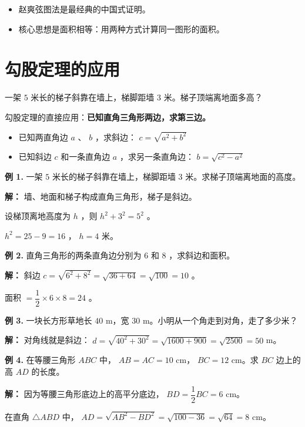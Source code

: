 \begin{keytakeaway}


\begin{itemize}
  \item 赵爽弦图法是最经典的中国式证明。
  \item 核心思想是面积相等：用两种方式计算同一图形的面积。
\end{itemize}


\end{keytakeaway}



\section*{勾股定理的应用}


\begin{explore}


一架 $5$ 米长的梯子斜靠在墙上，梯脚距墙 $3$ 米。梯子顶端离地面多高？

\end{explore}

\begin{understand}


勾股定理的直接应用：\textbf{已知直角三角形两边，求第三边。}

\begin{itemize}
  \item 已知两直角边 $a$ 、 $b$ ，求斜边： $c = \sqrt{a^2 + b^2}$
  \item 已知斜边 $c$ 和一条直角边 $a$ ，求另一条直角边： $b = \sqrt{c^2 - a^2}$
\end{itemize}


\end{understand}

\begin{workedexamples}


\textbf{例 1.} 一架 $5$ 米长的梯子斜靠在墙上，梯脚距墙 $3$ 米。求梯子顶端离地面的高度。

\textbf{解：}
墙、地面和梯子构成直角三角形，梯子是斜边。

设梯顶离地高度为 $h$ ，则 $h^2 + 3^2 = 5^2$ 。

$h^2 = 25 - 9 = 16$ ， $h = 4$ 米。

\textbf{例 2.} 直角三角形的两条直角边分别为 $6$ 和 $8$ ，求斜边和面积。

\textbf{解：}
斜边 $c = \sqrt{6^2 + 8^2} = \sqrt{36 + 64} = \sqrt{100} = 10$ 。

面积 $= \dfrac{1}{2} \times 6 \times 8 = 24$ 。

\textbf{例 3.} 一块长方形草地长 $40$ m，宽 $30$ m。小明从一个角走到对角，走了多少米？

\textbf{解：}
对角线就是斜边： $d = \sqrt{40^2 + 30^2} = \sqrt{1600 + 900} = \sqrt{2500} = 50$ m。

\textbf{例 4.} 在等腰三角形 $ABC$ 中， $AB = AC = 10$ cm， $BC = 12$ cm。求 $BC$ 边上的高 $AD$ 的长度。

\textbf{解：}
因为等腰三角形底边上的高平分底边， $BD = \dfrac{1}{2}BC = 6$ cm。

在直角 $\triangle ABD$ 中， $AD = \sqrt{AB^2 - BD^2} = \sqrt{100 - 36} = \sqrt{64} = 8$ cm。

\end{workedexamples}

